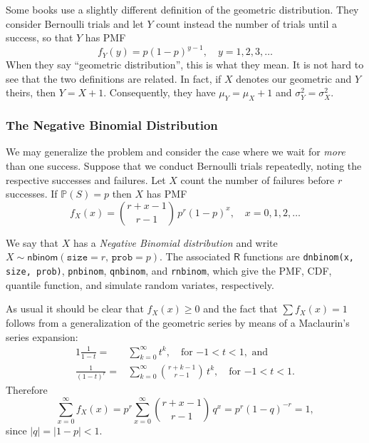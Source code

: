 \documentclass[captions=tableheading]{scrbook}
\begin{document}
\begin{note}
Some books use a slightly different definition of the geometric distribution. They consider Bernoulli trials and let \(Y\) count instead the number of trials until a success, so that \(Y\) has PMF
\begin{equation}
f_{Y}(y)=p(1-p)^{y-1},\quad y=1,2,3,\ldots
\end{equation}
When they say ``geometric distribution'', this is what they mean. It is not hard to see that the two definitions are related. In fact, if \(X\) denotes our geometric and \(Y\) theirs, then \(Y=X+1\). Consequently, they have \(\mu_{Y}=\mu_{X}+1\) and \(\sigma_{Y}^{2}=\sigma_{X}^{2}\).
\end{note}
\subsubsection{The Negative Binomial Distribution}
\label{sec-5-6-2-2}
\label{sub-The-Negative-Binomial}


We may generalize the problem and consider the case where we wait for \emph{more} than one success. Suppose that we conduct Bernoulli trials repeatedly, noting the respective successes and failures. Let \(X\) count the number of failures before \(r\) successes. If \(\mathbb{P}(S)=p\) then \(X\) has PMF
\begin{equation}
f_{X}(x)={r+x-1 \choose r-1}\, p^{r}(1-p)^{x},\quad x=0,1,2,\ldots
\end{equation}

We say that \(X\) has a \emph{Negative Binomial distribution} and write \(X\sim\mathsf{nbinom}(\mathtt{size}=r,\,\mathtt{prob}=p)\). The associated \(\mathsf{R}\) functions are \texttt{dnbinom(x, size, prob)}, \texttt{pnbinom}, \texttt{qnbinom}, and \texttt{rnbinom}, which give the PMF, CDF, quantile function, and simulate random variates, respectively.

As usual it should be clear that \(f_{X}(x)\geq 0\) and the fact that \(\sum f_{X}(x)=1\) follows from a generalization of the geometric series by means of a Maclaurin's series expansion:
\begin{alignat}{1}
\frac{1}{1-t}= & \sum_{k=0}^{\infty}t^{k},\quad \mbox{for \(-1 < t < 1\)},\mbox{ and}\\
\frac{1}{(1-t)^{r}}= & \sum_{k=0}^{\infty}{r+k-1 \choose r-1}\, t^{k},\quad \mbox{for \(-1 < t < 1\)}.
\end{alignat}
Therefore
\begin{equation}
\sum_{x=0}^{\infty}f_{X}(x)=p^{r}\sum_{x=0}^{\infty}{r+x-1 \choose r-1}\, q^{x}=p^{r}(1-q)^{-r}=1,
\end{equation}
since \(|q|=|1-p|<1\). 
\end{document}

